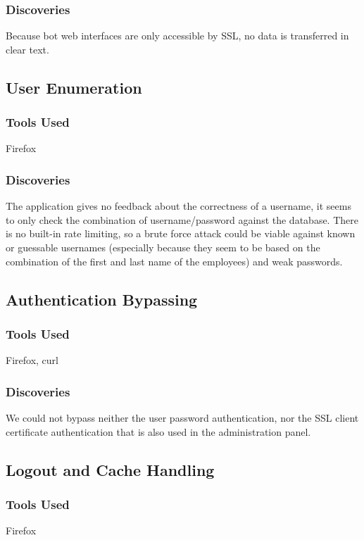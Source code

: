 \documentclass{article}
\begin{document}
\subsubsection{Discoveries}
Because bot web interfaces are only accessible by SSL, no data is transferred in clear text.

\subsection{User Enumeration}
\subsubsection{Tools Used}
Firefox

\subsubsection{Discoveries}
The application gives no feedback about the correctness of a username, it seems to only check the combination of username/password against the database. There is no built-in rate limiting, so a brute force attack could be viable against known or guessable usernames (especially because they seem to be based on the combination of the first and last name of the employees) and weak passwords.

\subsection{Authentication Bypassing}
\subsubsection{Tools Used}
Firefox, curl

\subsubsection{Discoveries}
We could not bypass neither the user password authentication, nor the SSL client certificate authentication that is also used in the administration panel.

\subsection{Logout and Cache Handling}
\subsubsection{Tools Used}
Firefox
\end{document}

